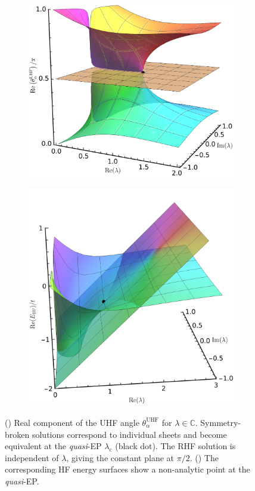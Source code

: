 \documentclass[aps,prb,reprint,noshowkeys,superscriptaddress]{revtex4-1}
\newcommand{\ta}{\theta_{\alpha}}
\newcommand{\bbC}{\mathbb{C}}
\begin{document}
\begin{figure}[t]
	\begin{subfigure}{0.49\textwidth}
    \includegraphics[height=0.65\textwidth,trim={0pt 0pt 0pt -35pt},clip]{HF_cplx_angle}
	\subcaption{\label{subfig:UHF_cplx_angle}}
    \end{subfigure}
	\begin{subfigure}{0.49\textwidth}
	\includegraphics[height=0.65\textwidth]{HF_cplx_energy}
	\subcaption{\label{subfig:UHF_cplx_energy}}
    \end{subfigure}
	\caption{%
    () Real component of the UHF angle $\ta^{\text{UHF}}$ for $\lambda \in \bbC$.
    Symmetry-broken solutions correspond to individual sheets and become equivalent at 
    the \textit{quasi}-EP $\lambda_{\text{c}}$ (black dot).
    The RHF solution is independent of $\lambda$, giving the constant plane at $\pi/2$.
    () The corresponding HF energy surfaces show a non-analytic 
    point at the \textit{quasi}-EP.
	\label{fig:HF_cplx}}
\end{figure}
\end{document}
